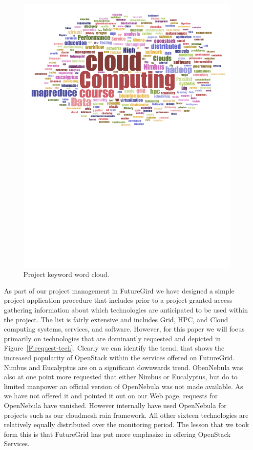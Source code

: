 \begin{figure}[p]
\begin{minipage}[t]{1.0\textwidth}
  \centering
    \includegraphics[width=1.0\textwidth]{images/fg-keyword-wordcloud.pdf}
  \caption{Project keyword word cloud.}\label{F:keycloud}
\end{minipage}
\end{figure}


As part of our project management in FutureGird we have designed a
simple project application procedure that includes prior to a project
granted access gathering information about which technologies are
anticipated to be used within the project. The list is fairly
extensive and includes Grid, HPC, and Cloud computing systems,
services, and software. However, for this paper we will focus
primarily on technologies that are dominantly requested and depicted
in Figure~\ref{F:request-tech}. Clearly we can identify the trend,
that shows the increased popularity of OpenStack within the services
offered on FutureGrid. Nimbus and Eucalyptus are on a significant
downwards trend. ObenNebula was also at one point more requested that
either Nimbus or Eucalyptus, but do to limited manpower an official
version of OpenNebula was not made available. As we have not offered
it and pointed it out on our Web page, requests for OpenNebula have vanished.
However internally have used OpenNebula for projects such as our cloudmesh rain
framework. All other sixteen technologies are relatively equally
distributed over the monitoring period. The lesson that we took form
this is that FutureGrid has put more emphasize in offering OpenStack Services.

